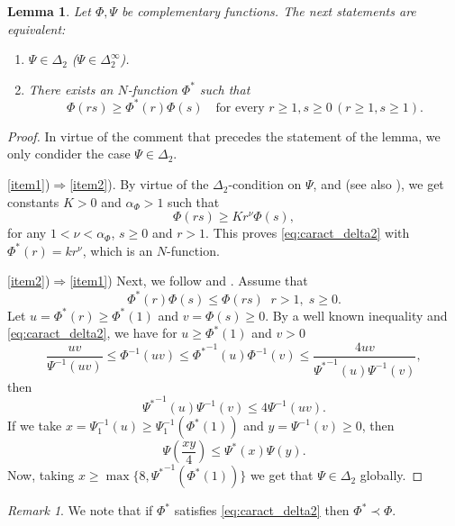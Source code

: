\documentclass[twoside]{article}
\newtheorem{lem}[thm]{Lemma}
\theoremstyle{remark}
\newtheorem{comentario}{Remark}
\renewcommand{\leq}{\leqslant}
\renewcommand{\geq}{\geqslant}
\begin{document}
\begin{lem}\label{lem:submultipliativa}
Let $\Phi,\Psi$ be complementary functions.
The next statements are equivalent:
\begin{enumerate}
\item\label{item1} $\Psi \in \Delta_2$ ($\Psi \in \Delta_2^{\infty}$).
\item\label{item2} There exists an $N$-function $\Phi^*$ such that
\begin{equation}\label{eq:caract_delta2}
\Phi(rs)\geq \Phi^*(r)\Phi(s)\quad\mbox{for every }r\geq1,s\geq 0\, (r\geq1,s\geq 1).
\end{equation}
\end{enumerate}
\end{lem}

\begin{proof}
 In virtue of the comment that precedes the statement of the lemma, we only condider the case   $\Psi \in \Delta_2$.

\ref{item1})$\Rightarrow$\ref{item2}).
By virtue of the $\Delta_2$-condition on $\Psi$, \cite[Thm. 11.7]{M} and \cite[Cor. 11.6]{M} (see also  \cite[Eq. (2.8)]{AGMS}), we get constants $K>0$ and $\alpha_{\Phi}>1$ such that
\begin{equation}\label{delta2-consecuencia}
\Phi(r s)\geq Kr^{\nu}\Phi(s),
\end{equation}
for any $1<\nu<\alpha_{\Phi}$,  $s\geq 0$ and $r>1$. This proves  \eqref{eq:caract_delta2} with $\Phi^*(r)=kr^\nu$, which is an $N$-function.

\ref{item2})$\Rightarrow$\ref{item1})
Next, we follow  \cite[p. 32, Prop. 13]{rao1991theory} and \cite[p. 29, Prop. 9]{rao1991theory}.
Assume that 
\[
\Phi^*(r)\Phi(s)\leq \Phi(rs)\;\;r>1,\;s\geq 0.
\]
Let $u=\Phi^*(r)\geq \Phi^*(1)$ and $v=\Phi(s)\geq 0$. By a well known inequality \cite[p. 13, Prop. 1]{rao1991theory} and \eqref{eq:caract_delta2},  we have  for $u\geq \Phi^*(1)$ and $v> 0$
\[
\frac{uv}{\Psi^{-1}(uv)}\leq \Phi^{-1}(uv)\leq{\Phi^*}^{-1}(u)\Phi^{-1}(v)\leq
\frac{4uv}{{\Psi^*}^{-1}(u)\Psi^{-1}(v)},
\]
then 
\[
{\Psi^*}^{-1}(u)\Psi^{-1}(v)\leq 4 \Psi^{-1}(uv).
\]
If we take $x=\Psi^{-1}_1(u)\geq \Psi^{-1}_1(\Phi^*(1))$ and $y=\Psi^{-1}(v)\geq 0$, then 
\[
\Psi\left(\frac{xy}{4}\right)\leq \Psi^*(x)\Psi(y).
\]
Now, taking  $x\geq \max\{8,{\Psi^*}^{-1}(\Phi^*(1))\}$ we get that $\Psi \in \Delta_2$ globally.
\end{proof}

\begin{comentario} We note that if $\Phi^*$ satisfies \eqref{eq:caract_delta2} then $\Phi^*\prec \Phi$.
 \end{comentario}
\end{document}
